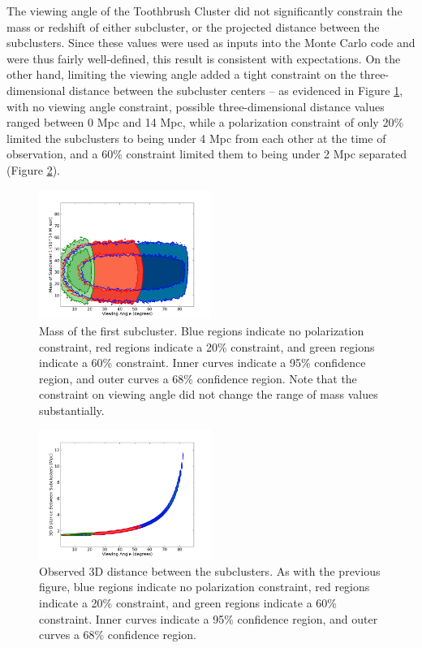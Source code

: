 \documentclass[12 pt]{article}
\renewcommand{\baselinestretch}{2}
\begin{document}
The viewing angle of the Toothbrush Cluster did not significantly constrain the mass or redshift of either subcluster, or the projected distance between the subclusters. Since these values were used as inputs into the Monte Carlo code and were thus fairly well-defined, this result is consistent with expectations. On the other hand, limiting the viewing angle added a tight constraint on the three-dimensional distance between the subcluster centers – as evidenced in Figure \ref{mass}, with no viewing angle constraint, possible three-dimensional distance values ranged between 0 Mpc and 14 Mpc, while a polarization constraint of only 20\% limited the subclusters to being under 4 Mpc from each other at the time of observation, and a 60\% constraint limited them to being under 2 Mpc separated (Figure \ref{d3d}). 

\renewcommand{\baselinestretch}{1}
\begin{figure}[h]
\caption{Mass of the first subcluster. Blue regions indicate no polarization constraint, red regions indicate a 20\% constraint, and green regions indicate a 60\% constraint. Inner curves indicate a 95\% confidence region, and outer curves a 68\% confidence region. Note that the constraint on viewing angle did not change the range of mass values substantially.}
\label{mass}
\centering
\includegraphics[width=0.5\textwidth]{alpha_m_1}
\end{figure}
\renewcommand{\baselinestretch}{2}

\renewcommand{\baselinestretch}{1}
\begin{figure}[h]
\caption{Observed 3D distance between the subclusters. As with the previous figure, blue regions indicate no polarization constraint, red regions indicate a 20\% constraint, and green regions indicate a 60\% constraint. Inner curves indicate a 95\% confidence region, and outer curves a 68\% confidence region.}
\label{d3d}
\centering
\includegraphics[width=0.5\textwidth]{alpha_d_3d}
\end{figure}
\renewcommand{\baselinestretch}{2}
\end{document}

